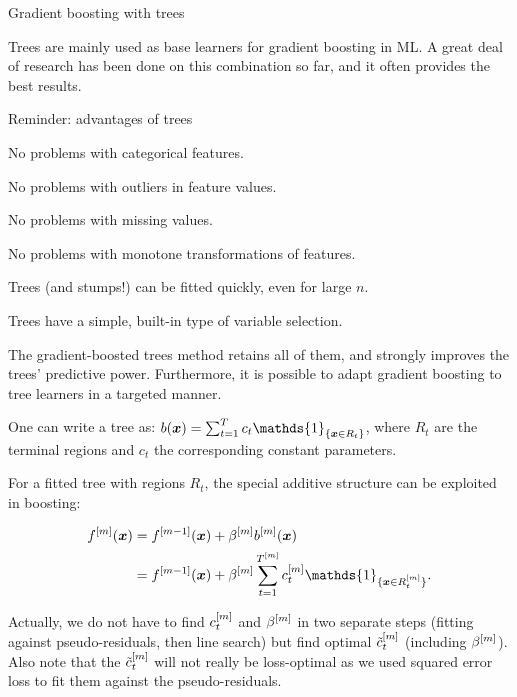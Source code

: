 \begin{vbframe}{Gradient boosting with trees}

Trees are mainly used as base learners for gradient boosting in ML.
A great deal of research has been done on this combination so far, and it often provides the best results.

\begin{blocki}{Reminder: advantages of trees}
\item No problems with categorical features.
\item No problems with outliers in feature values.
\item No problems with missing values.
\item No problems with monotone transformations of features.
\item Trees (and stumps!) can be fitted quickly, even for large $n$.
\item Trees have a simple, built-in type of variable selection.
\end{blocki}
The gradient-boosted trees method retains all of them, and strongly improves the trees' predictive power.
Furthermore, it is possible to adapt gradient boosting to tree learners in a targeted manner.

\framebreak


One can write a tree as: $ b(\xv) = \sum_{t=1}^{T} c_t \mathds{1}_{\{\xv \in R_t\}} $,
where $R_t$ are the terminal regions and $c_t$ the corresponding constant parameters.

\vspace*{0.2cm}

For a fitted tree with regions $R_t$, the special additive structure can be exploited in boosting:  %

\begin{align*}
  \fm(\xv) &= \fmd(\xv) +  \betam \bmm(\xv) \\
         &= \fmd(\xv) +  \betam \sum_{t=1}^{\Tm} \ctm \mathds{1}_{\{\xv \in \Rtm\}}.
\end{align*}

Actually, we do not have to find $c_t^{[m]}$ and $\beta^{[m]}$ in two separate steps
(fitting against pseudo-residuals, then line search) but find optimal 
\textcolor{blue}{$\tilde{c}_t^{[m]}$} (including $\beta^{[m]}$).
Also note that the \textcolor{blue}{$\tilde{c}_t^{[m]}$} will not really be loss-optimal as 
we used squared error loss
to fit them against the pseudo-residuals.


\end{vbframe}
